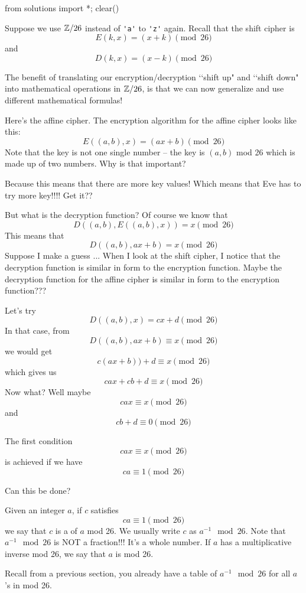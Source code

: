\begin{python0}
from solutions import *; clear()
\end{python0}

Suppose we use $\mathbb Z/26$ instead of \verb!'a'! to \verb!'z'! again.
Recall that the shift cipher is
\[
  E(k, x) = (x + k) \pmod{26}
\]
and
\[
    D(k, x) = (x - k) \pmod{26}
\]

The benefit of translating our encryption/decryption
\lq\lq shift up" and \lq\lq shift down" into
mathematical operations in $\mathbb Z/26$, is that
we can now generalize and use different mathematical formulas!

Here's the affine cipher.
The encryption algorithm for the affine cipher looks like this:
\[
E((a,b), x) = (ax + b) \pmod{26}
\]
Note that the key is not one single number -- the key
is $(a, b)$ mod 26 which is made up of two numbers.
Why is that important?

Because this means that there are more key values!
Which means that Eve has to try more key!!!!
Get it??

But what is the decryption function?
Of course we know that
\[
D((a,b), E((a,b), x)) = x \pmod{26}
\]
This means that
\[
D((a,b), ax + b) = x \pmod{26}
\]
Suppose I make a guess ...
When I look at the shift cipher, I notice that the
decryption function is similar in form to the encryption function.
Maybe the decryption function for the affine cipher
is similar in form to the encryption function???

Let's try
\[
  D((a,b), x) = cx + d \pmod{26}
\]
In that case, from 
\[
D((a,b), ax + b) \equiv x \pmod{26}
\]
we would get
\[
c(ax + b)) + d \equiv x \pmod{26}
\]
which gives us
\[
cax + cb + d \equiv x \pmod{26}
\]
Now what?
Well maybe
\[
cax \equiv x \pmod{26}
\]
and
\[
cb + d \equiv 0 \pmod{26}
\]

The first condition
\[
cax \equiv x \pmod{26}
\]
is achieved if we have
\[
ca \equiv 1 \pmod{26}
\]

Can this be done?




Given an integer $a$, if $c$ satisfies
\[
  ca \equiv 1 \pmod{26}
\]
we say that $c$ is a
of $a$ mod 26.
We usually write $c$ as $a^{-1} \mod 26$.
Note that $a^{-1} \mod 26$ is NOT a fraction!!!
It's a whole number.
If $a$ has a multiplicative inverse mod 26, we say that
$a$ is
mod 26.

Recall from a previous section, you already
have a table of $a^{-1} \mod 26$ for all $a$'s in mod 26.

